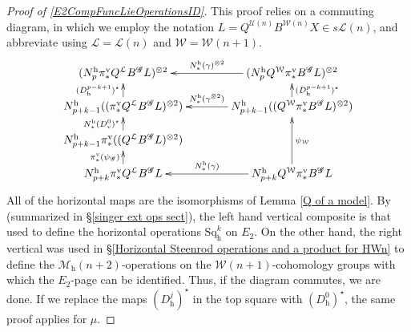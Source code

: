 \documentclass[11pt]{amsart} \renewcommand{\baselinestretch}{1.2}
\theoremstyle{plain}
\theoremstyle{definition}
\newcommand{\scrG}{\mathscr{G}}
\newcommand{\calU}{\mathcal{U}}
\newcommand{\calL}{\mathcal{L}}
\newcommand{\calw}{\mathcal{W}}
\newcommand{\calMh}{\mathcal{M}\dhor}
\newcommand{\BSW}{{\scrG}}
\newcommand{\BSWres}{B^\BSW}%
\newcommand{\Sq}{\mathrm{Sq}}
\newcommand{\uver}{^\mathrm{v}}
\newcommand{\uhor}{^\mathrm{h}}
\newcommand{\dver}{_\mathrm{v}}
\newcommand{\dhor}{_\mathrm{h}}
\begin{document}
\begin{Operations in composite functor spectral sequences}
\begin{proof}[Proof of \ref{E2CompFuncLieOperationsID}]
This proof relies on a commuting diagram, in which we employ the  notation $L=Q^{\calU(n)} B^{\calw(n)}X \in s\calL(n)$, and abbreviate using $\calL=\calL(n)$ and $\calw=\calw(n+1)$.
\[\xymatrix@C=13mm@R=4mm{
(N\uhor_p\pi\uver_*Q^{\calL}\BSWres L)^{\otimes2}&%
(N\uhor_pQ^{\calw}\pi\uver_*\BSWres L)^{\otimes2}
\ar[l]_-{N\uhor_*(\gamma)^{\otimes 2}}
\\%
N\uhor_{p+k-1}((\pi\uver_*Q^{\calL}\BSWres L)^{\otimes2})
\ar[u]^-{(D\dhor^{p-k+1})^\star}
&%
N\uhor_{p+k-1}((Q^{\calw}\pi\uver_*\BSWres L)^{\otimes2})
\ar[u]_-{(D\dhor^{p-k+1})^\star}
\ar[l]_-{N\uhor_*(\gamma^{\otimes 2})}
\\%
N\uhor_{p+k-1}\pi\uver_*((Q^{\calL}\BSWres L)^{\otimes2})
\ar[u]^-{N\uhor_*(D\dver^0)^\star}
&%
\\%
N\uhor_{p+k}\pi\uver_* Q^{\calL}\BSWres L
\ar[u]^-{\pi\uver_*(\psi_\BSW)}
&%
N\uhor_{p+k}Q^{\calw}\pi\uver_* \BSWres L
\ar[uu]_-{\psi_{\calw}}
\ar[l]_-{N\uhor_*(\gamma)}
}\]
All of the horizontal maps are the isomorphisms of Lemma \ref{Q of a model}. By \cite[Theorem 2.23]{MR2245560} (summarized in \S\ref{singer ext ops sect}),  the left hand vertical composite is that used to define the horizontal operations $\Sq\dhor^{k}$ on $E_2$. On the other hand, the right vertical was used in \S\ref{Horizontal Steenrod operations and a product for HWn} to define the $\calMh(n+2)$-operations on the $\calw(n+1)$-cohomology groups with which the $E_2$-page can be identified. Thus, if the diagram commutes, we are done. If we replace the maps $(D\dhor^j)^\star$ in the top square with $(D\dhor^0)^\star$, the same proof applies for $\mu$.


\end{proof}
\end{Operations in composite functor spectral sequences}
\end{document}
